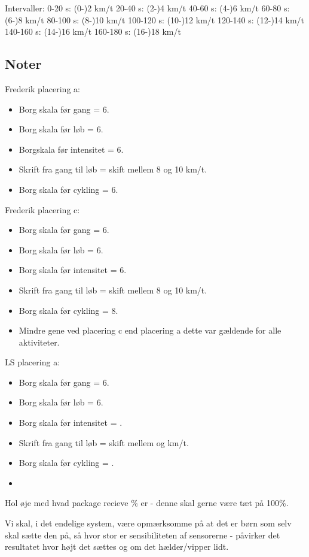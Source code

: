 Intervaller: 
0-20 s: (0-)2 km/t
20-40 s: (2-)4 km/t
40-60 s: (4-)6 km/t
60-80 s:  (6-)8 km/t 
80-100 s: (8-)10 km/t
100-120 s: (10-)12 km/t
120-140 s: (12-)14 km/t
140-160 s: (14-)16 km/t
160-180 s: (16-)18 km/t


\subsection{Noter} 
Frederik placering a: 
\begin{itemize}
	\item Borg skala før gang = 6.
	\item Borg skala før løb = 6.
	\item Borgskala før intensitet = 6.
	\item Skrift fra gang til løb = skift mellem 8 og 10 km/t.
	\item Borg skala før cykling = 6.
\end{itemize}

Frederik placering c: 
\begin{itemize}
	\item Borg skala før gang = 6.
	\item Borg skala før løb = 6.
	\item Borg skala før intensitet = 6.
	\item Skrift fra gang til løb = skift mellem 8 og 10 km/t.
	\item Borg skala før cykling = 8.
	\item Mindre gene ved placering c end placering a dette var gældende for alle aktiviteter. 
\end{itemize}


LS placering a: 
\begin{itemize}
	\item Borg skala før gang = 6.
	\item Borg skala før løb = 6.
	\item Borg skala før intensitet = .
	\item Skrift fra gang til løb = skift mellem  og  km/t.
	\item Borg skala før cykling = .
	\item  
\end{itemize}

Hol øje med hvad package recieve \% er - denne skal gerne være tæt på 100\%.







Vi skal, i det endelige system, være opmærksomme på at det er børn som selv skal sætte den på, så hvor stor er sensibiliteten af sensorerne - påvirker det resultatet hvor højt det sættes og om det hælder/vipper lidt. 

